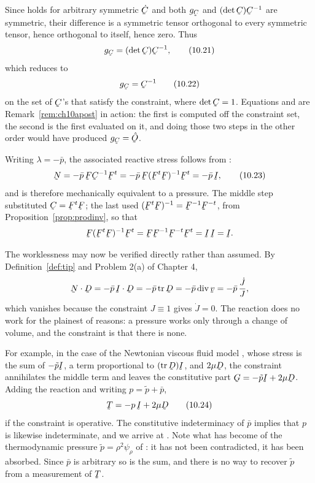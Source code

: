Since  holds for arbitrary symmetric $\dot\bC$ and both
$g_{\bC}$ and $(\det\bC)\bC^{-1}$ are symmetric, their difference is a
symmetric tensor orthogonal to every symmetric tensor, hence orthogonal
to itself, hence zero. Thus
\begin{equation}
   g_{\bC}=(\det\bC)\bC^{-1},
   \tag{10.21}\label{eq:10.21}
\end{equation}
which reduces to
\begin{equation}
   g_{\bC}=\bC^{-1}
   \tag{10.22}\label{eq:10.22}
\end{equation}
on the set of $\bC$'s that satisfy the constraint, where $\det\bC=1$.
Equations  and  are Remark~\ref{rem:ch10apost} in
action: the first is computed off the constraint set, the second is the
first evaluated on it, and doing those two steps in the other order would
have produced $g_{\bC}=\hOb$.

Writing $\lambda=-\bar p$, the associated reactive stress follows from
:
\begin{equation}
   \bN=-\bar p\,\bF\bC^{-1}\bF^{t}=-\bar p\,\bF(\bF^{t}\bF)^{-1}\bF^{t}
   =-\bar p\,\I ,
   \tag{10.23}\label{eq:10.23}
\end{equation}
and is therefore mechanically equivalent to a pressure. The middle step
substituted $\bC=\bF^{t}\bF$; the last used
$(\bF^{t}\bF)^{-1}=\bF^{-1}\bF^{-t}$, from
Proposition~\ref{prop:prodinv}, so that
\[
   \bF(\bF^{t}\bF)^{-1}\bF^{t}=\bF\bF^{-1}\bF^{-t}\bF^{t}
   =\I\,\I=\I .
\]

The worklessness may now be verified directly rather than assumed. By
Definition~\ref{def:tip} and Problem 2(a) of Chapter 4,
\[
   \bN\cdot\bD=-\bar p\,\I\cdot\bD=-\bar p\tr\bD=-\bar p\dvg\bv
   =-\bar p\,\frac{\dot J}{J},
\]
which vanishes because the constraint $J\equiv1$ gives $\dot J=0$. The
reaction does no work for the plainest of reasons: a pressure works only
through a change of volume, and the constraint is that there is none.

For example, in the case of the Newtonian viscous fluid model ,
whose stress is the sum of $-\tilde p\I$, a term proportional to
$(\tr\bD)\I$, and $2\mu\bD$, the constraint annihilates the middle term
and leaves the constitutive part $\bG=-\tilde p\I+2\mu\bD$. Adding the
reaction  and writing $p=\tilde p+\bar p$,
\begin{equation}
   \bT=-p\,\I+2\mu\bD
   \tag{10.24}\label{eq:10.24}
\end{equation}
if the constraint is operative. The constitutive indeterminacy of
$\bar p$ implies that $p$ is likewise indeterminate, and we arrive at
. Note what has become of the thermodynamic pressure
$\tilde p=\rho^{2}\psi_{\rho}$ of : it has not been
contradicted, it has been absorbed. Since $\bar p$ is arbitrary so is the
sum, and there is no way to recover $\tilde p$ from a measurement of
$\bT$.

